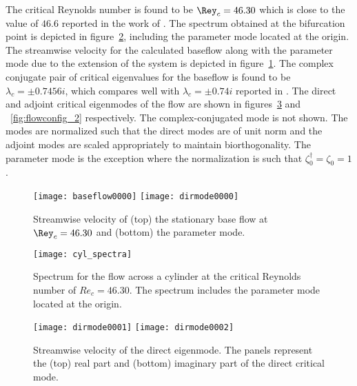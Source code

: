 The critical Reynolds number is found to be $\Rey_{c} = 46.30$ which is close to the value of $46.6$ reported in the work of \cite{sipp07}. The spectrum obtained at the bifurcation point is depicted in figure~\ref{fig:cyl_spectrum}, including the parameter mode located at the origin. The streamwise velocity for the calculated baseflow along with the parameter mode due to the extension of the system is depicted in figure~\ref{fig:base_param}. The complex conjugate pair of critical eigenvalues for the baseflow is found to be $\lambda_{c} = \pm0.7456i$, which compares well with $\lambda_{c}=\pm0.74i$ reported in \cite{sipp07}. The direct and adjoint critical eigenmodes of the flow are shown in figures~\ref{fig:flowconfig} and ~\ref{fig:flowconfig_2} respectively. The complex-conjugated mode is not shown. The modes are normalized such that the direct modes are of unit norm and the adjoint modes are scaled appropriately to maintain biorthogonality. The parameter mode is the exception where the normalization is such that $\zeta^{\dagger}_{0} = \zeta_{0} = 1$.
\begin{figure}
	\centering
	\texttt{[image: baseflow0000]}
	\texttt{[image: dirmode0000]}
	\caption{Streamwise velocity of (top) the stationary base flow at $\Rey_{c}=46.30$ and (bottom) the parameter mode.}
	\label{fig:base_param}
\end{figure}	

\begin{figure}
	\centering
	\texttt{[image: cyl\_spectra]}
	\caption{Spectrum for the flow across a cylinder at the critical Reynolds number of $Re_{c}=46.30$. The spectrum includes the parameter mode located at the origin.}
	\label{fig:cyl_spectrum}
\end{figure}	


\begin{figure}
	\texttt{[image: dirmode0001]}
	\texttt{[image: dirmode0002]}
	\caption{Streamwise velocity of the direct eigenmode. The panels represent the (top) real part and (bottom) imaginary part of the direct critical mode.}
	\label{fig:flowconfig}
\end{figure}

